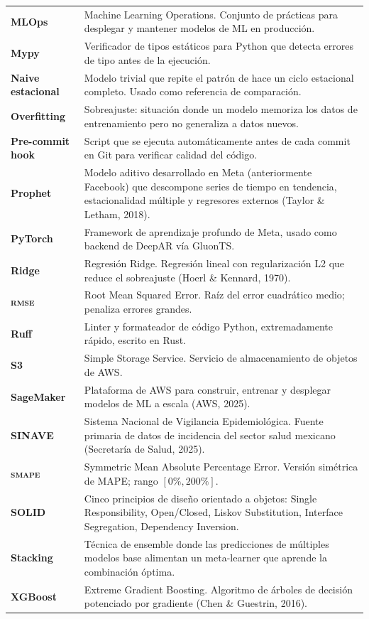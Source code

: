 \documentclass[12pt, letterpaper]{article}
\newcommand{\smape}{\textnormal{\textsc{smape}}}
\newcommand{\rmse}{\textnormal{\textsc{rmse}}}
\begin{document}
\begin{longtable}{>{\bfseries}l p{11cm}}
MLOps & Machine Learning Operations. Conjunto de prácticas para desplegar y mantener modelos de ML en producción. \\
Mypy & Verificador de tipos estáticos para Python que detecta errores de tipo antes de la ejecución. \\
Naive estacional & Modelo trivial que repite el patrón de hace un ciclo estacional completo. Usado como referencia de comparación. \\
Overfitting & Sobreajuste: situación donde un modelo memoriza los datos de entrenamiento pero no generaliza a datos nuevos. \\
Pre-commit hook & Script que se ejecuta automáticamente antes de cada commit en Git para verificar calidad del código. \\
Prophet & Modelo aditivo desarrollado en Meta (anteriormente Facebook) que descompone series de tiempo en tendencia, estacionalidad múltiple y regresores externos (Taylor \& Letham, 2018). \\
PyTorch & Framework de aprendizaje profundo de Meta, usado como backend de DeepAR vía GluonTS. \\
Ridge & Regresión Ridge. Regresión lineal con regularización L2 que reduce el sobreajuste (Hoerl \& Kennard, 1970). \\
\rmse{} & Root Mean Squared Error. Raíz del error cuadrático medio; penaliza errores grandes. \\
Ruff & Linter y formateador de código Python, extremadamente rápido, escrito en Rust. \\
S3 & Simple Storage Service. Servicio de almacenamiento de objetos de AWS. \\
SageMaker & Plataforma de AWS para construir, entrenar y desplegar modelos de ML a escala (AWS, 2025). \\
SINAVE & Sistema Nacional de Vigilancia Epidemiológica. Fuente primaria de datos de incidencia del sector salud mexicano (Secretaría de Salud, 2025). \\
\smape{} & Symmetric Mean Absolute Percentage Error. Versión simétrica de MAPE; rango $[0\%, 200\%]$. \\
SOLID & Cinco principios de diseño orientado a objetos: Single Responsibility, Open/Closed, Liskov Substitution, Interface Segregation, Dependency Inversion. \\
Stacking & Técnica de ensemble donde las predicciones de múltiples modelos base alimentan un meta-learner que aprende la combinación óptima. \\
XGBoost & Extreme Gradient Boosting. Algoritmo de árboles de decisión potenciado por gradiente (Chen \& Guestrin, 2016). \\
\end{longtable}
\end{document}
